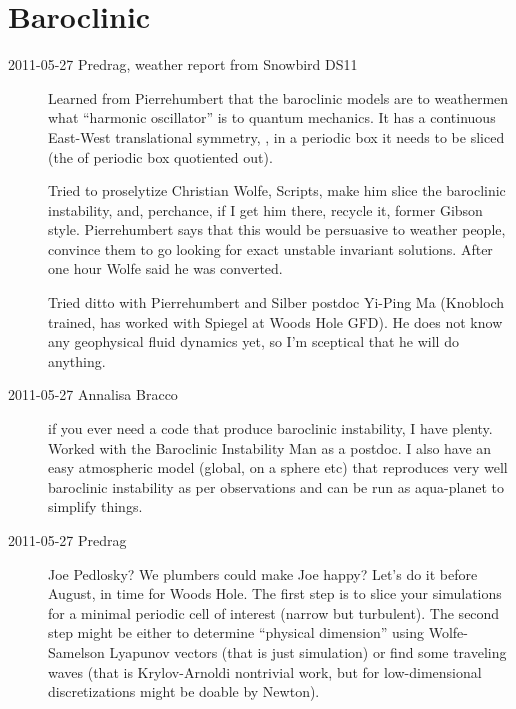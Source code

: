 
\chapter{Baroclinic}
\label{chap:baroclinic}

\begin{description}

\item[2011-05-27 Predrag, weather report from Snowbird DS11]
	\toCB
Learned from Pierrehumbert that the baroclinic models are to
weathermen what ``harmonic oscillator'' is to quantum mechanics. It has a
continuous East-West translational symmetry, \ie, in a periodic box it
needs to be sliced (the  of periodic box quotiented out).

Tried to proselytize Christian Wolfe, Scripts,  make him slice
the baroclinic instability, and, perchance, if I get him there, recycle
it, former Gibson style. Pierrehumbert says that this would be persuasive
to weather people, convince them to go looking for exact unstable
invariant solutions. After one hour Wolfe said he was converted.

Tried ditto with Pierrehumbert and Silber postdoc Yi-Ping Ma (Knobloch
trained, has worked with Spiegel at Woods Hole GFD). He does not know any
geophysical fluid dynamics yet, so I'm sceptical that he will do
anything.

\item[2011-05-27 Annalisa Bracco]
if you ever need a code that produce baroclinic instability, I have plenty.
Worked with the Baroclinic Instability Man as a postdoc.
I also have an easy atmospheric model (global, on a sphere etc)
that reproduces very well baroclinic instability as per observations
and can be run as aqua-planet to simplify things.

\item[2011-05-27 Predrag]
Joe Pedlosky? We plumbers could make Joe happy?
Let's do it before August, in time for Woods Hole. The first step is to slice
your simulations for a minimal periodic cell of interest (narrow but turbulent).
The second step might be either to determine ``physical dimension'' using
Wolfe-Samelson Lyapunov vectors (that is just simulation) or find
some traveling waves (that is Krylov-Arnoldi nontrivial work,
but for low-dimensional discretizations might be doable by Newton).

\end{description}
